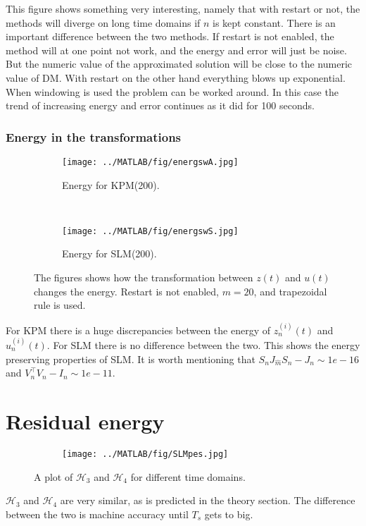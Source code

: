 This figure shows something very interesting, namely that with restart or not, the methods will diverge on long time domains if $n$ is kept constant. There is an important difference between the two methods. If restart is not enabled, the method will at one point not work, and the energy and error will just be noise. But the numeric value of the approximated solution will be close to the numeric value of DM. With restart on the other hand everything blows up exponential. When windowing is used the problem can be worked around. In this case the trend of increasing energy and error continues as it did for 100 seconds. \\

\subsubsection{Energy in the transformations}%

\begin{figure}[H]
        \centering
        \begin{subfigure}[b]{0.45\textwidth}
                \texttt{[image: ../MATLAB/fig/energswA.jpg]}
                \caption{ Energy for KPM(200). }
                \label{fig:energyswA}
        \end{subfigure}
        ~
		\begin{subfigure}[b]{0.45\textwidth}
                \texttt{[image: ../MATLAB/fig/energswS.jpg]}
                \caption{ Energy for SLM(200). }
                \label{fig:energswS}
        \end{subfigure}        
        \caption{ The figures shows how the transformation between $z(t)$ and $u(t)$ changes the energy. Restart is not enabled, $m = 20$, and trapezoidal rule is used. }
        \label{fig:energs}
\end{figure}
For KPM there is a huge discrepancies between the energy of $z_{n}^{(i)}(t)$ and $u_{n}^{(i)}(t)$. For SLM there is no difference between the two. This shows the energy preserving properties of SLM. It is worth mentioning that $S_n J_{\hat{m}}S_n - J_n \sim 1e-16$ and $V_n^\top V_n - I_n \sim 1e-11$.
\section{Residual energy}%
\label{sec:residualenergy}
\begin{figure}[H]
        \centering
        \begin{subfigure}[b]{0.45\textwidth}
                \texttt{[image: ../MATLAB/fig/SLMpes.jpg]}
        \end{subfigure}
		
        \caption{ A plot of $\mathcal{H}_3$ and $\mathcal{H}_4$ for different time domains. }
        \label{fig:SLMpes}
\end{figure}
$\mathcal{H}_3$ and $\mathcal{H}_4$ are very similar, as is predicted in the theory section. The difference between the two is machine accuracy until $T_s$ gets to big. \\
